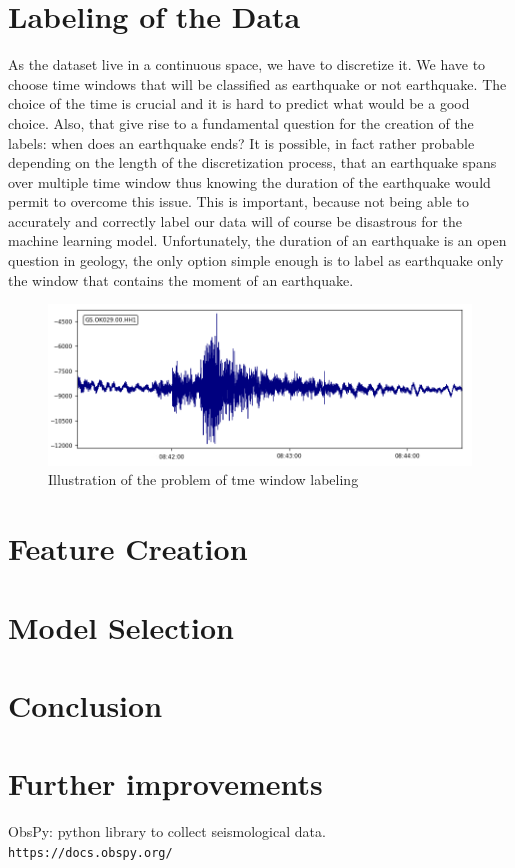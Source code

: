 \documentclass[10pt,conference,compsocconf]{IEEEtran}
\begin{document}
\section{Labeling of the Data}
As the dataset live in a continuous space, we have to discretize it. We have to choose time windows that will be classified as earthquake or not earthquake. The choice of the time is crucial and it is hard to predict what would be a good choice. Also, that give rise to a fundamental question for the creation of the labels: when does an earthquake ends? It is possible, in fact rather probable depending on the length of the discretization process, that an earthquake spans over multiple time window thus knowing the duration of the earthquake would permit to overcome this issue. This is important, because not being able to accurately and correctly label our data will of course be disastrous for the machine learning model. Unfortunately, the duration of an earthquake is an open question in geology, the only option simple enough is to label as earthquake only the window that contains the moment of an earthquake.

\begin{figure}[h]
  \centering
	\includegraphics[width=\columnwidth]{../processed-data/problem-time-window-labeling.png}
  \caption{Illustration of the problem of tme window labeling}
	\label{fig:10min-example}
\end{figure}

\section{Feature Creation}

\section{Model Selection}

\section{Conclusion}

\section{Further improvements}

\begin{thebibliography}{9}
ObsPy: python library to collect seismological data.
\\\texttt{https://docs.obspy.org/}
\end{thebibliography}
\end{document}
